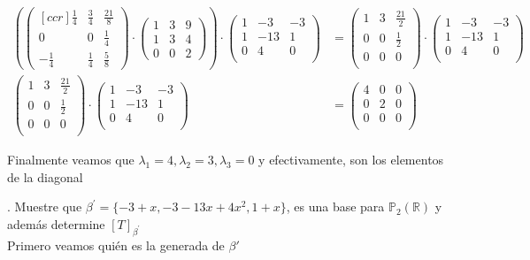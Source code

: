 \documentclass[letterpaper]{article}
\renewcommand{\*}{\cdot}
\newcommand{\T}{\begin{pmatrix}
		1 & 3 & 9 \\
		1 & 3 & 4 \\
		0 & 0 & 2 
\end{pmatrix} }
\theoremstyle{definition}
\begin{document}
\begin{align*}
	\left( \begin{pmatrix}[ccr]
	\frac{1}{4} &\frac{3}{4} & \frac{21}{8} \\
	0 & 0 & \frac{1}{4}\\
	-\frac{1}{4} & \frac{1}{4} & \frac{5}{8}
	\end{pmatrix} \* \T \right) \* \begin{pmatrix}
	1 & -3 & -3\\
	1 & -13 & 1\\
	0 & 4 & 0\\
	\end{pmatrix} &= \begin{pmatrix}
	1 & 3 & \frac{21}{2}\\
	0 & 0 & \frac{1}{2}\\
	0 & 0 & 0\\
	\end{pmatrix} \* \begin{pmatrix}
	1 & -3 & -3\\
	1 & -13 & 1\\
	0 & 4 & 0\\
	\end{pmatrix} \\
	\begin{pmatrix}
	1 & 3 & \frac{21}{2}\\
	0 & 0 & \frac{1}{2}\\
	0 & 0 & 0\\
	\end{pmatrix} \* \begin{pmatrix}
	1 & -3 & -3\\
	1 & -13 & 1\\
	0 & 4 & 0\\
	\end{pmatrix} & = \begin{pmatrix}
	4 & 0 & 0\\
	0 & 2 & 0\\
	0 & 0 & 0\\
	\end{pmatrix}
\end{align*}

\begin{center}
Finalmente veamos que $ \lambda_1 = 4, \lambda_2 = 3, \lambda_3 = 0 $ y efectivamente, son los elementos de la diagonal
\end{center}

. Muestre que $\beta^{'} =\{ -3+x , -3-13x + 4x^2, 1+x \}$, es una base para $ \mathbb{P}_{2}(\mathbb{R})$ y además determine $[T]_{\beta^{'}}$ \\
Primero veamos quién es la generada de $ \beta' $
\end{document}
